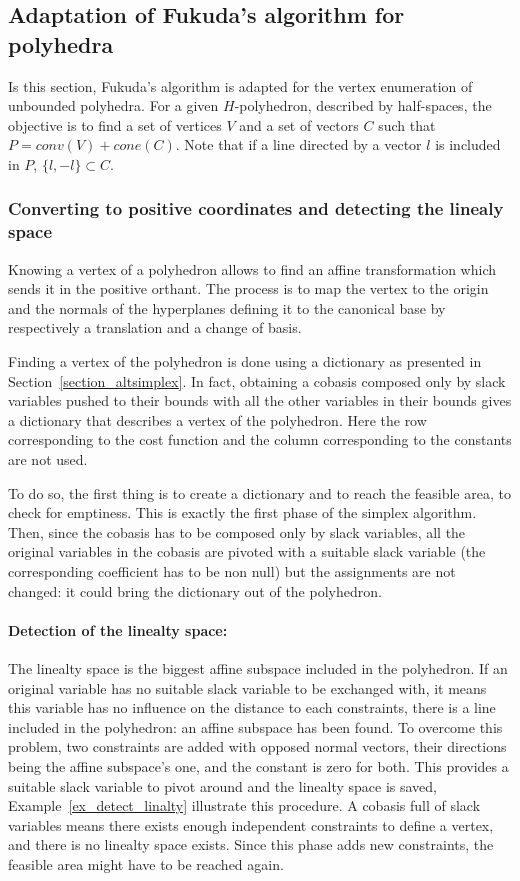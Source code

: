\subsection{Adaptation of Fukuda's algorithm for polyhedra}

Is this section, Fukuda's algorithm is adapted for the vertex enumeration of unbounded polyhedra. For a given $H$-polyhedron, described by half-spaces, the objective is to find a set of vertices $V$ and a set of vectors $C$ such that $P = conv(V)+cone(C)$. Note that if a line directed by a vector $l$ is included in $P$, $\{l,-l\}\subset C$. 

\subsubsection{Converting to positive coordinates and detecting the linealy space}

Knowing a vertex of a polyhedron allows to find an affine transformation which sends it in the positive orthant. The process is to map the vertex to the origin and the normals of the hyperplanes defining it to the canonical base by respectively a translation and a change of basis.

Finding a vertex of the polyhedron is done using a dictionary as presented in Section~\ref{section_altsimplex}. In fact, obtaining a cobasis composed only by slack variables pushed to their bounds with all the other variables in their bounds gives a dictionary that describes a vertex of the polyhedron. Here the row corresponding to the cost function and the column corresponding to the constants are not used.


To do so, the first thing is to create a dictionary and to reach the feasible area, to check for emptiness. This is exactly the first phase of the simplex algorithm. Then, since the cobasis has to be composed only by slack variables, all the original variables in the cobasis are pivoted with a suitable slack variable (the corresponding coefficient has to be non null) but the assignments are not changed: it could bring the dictionary out of the polyhedron. 

\paragraph*{Detection of the linealty space:} The linealty space is the biggest affine subspace included in the polyhedron. If an original variable has no suitable slack variable to be exchanged with, it means this variable has no influence on the distance to each constraints, there is a line included in the polyhedron: an affine subspace has been found. To overcome this problem, two constraints are added with opposed normal vectors, their directions being the affine subspace's one, and the constant is zero for both. This provides a suitable slack variable to pivot around and the linealty space is saved, Example~\ref{ex_detect_linalty} illustrate this procedure. A cobasis full of slack variables means there exists enough independent constraints to define a vertex, and there is no linealty space exists. Since this phase adds new constraints, the feasible area might have to be reached again.

